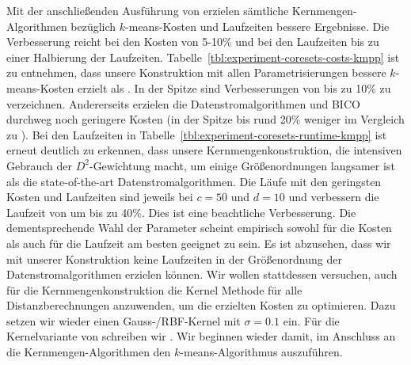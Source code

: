 Mit der anschließenden Ausführung von \kmpp{} erzielen sämtliche Kernmengen-Algorithmen bezüglich $k$-means-Kosten und
Laufzeiten bessere Ergebnisse. Die Verbesserung reicht bei den Kosten von 5-10\% und bei den Laufzeiten bis zu einer Halbierung
der Laufzeiten.
Tabelle~\ref{tbl:experiment-coresets-costs-kmpp} ist zu entnehmen, dass unsere Konstruktion mit allen Parametrisierungen bessere
$k$-means-Kosten erzielt als \kmpp. In der Spitze sind Verbesserungen von bis zu 10\% zu verzeichnen. Andererseits erzielen
die Datenstromalgorithmen \Skmpp und BICO durchweg noch geringere Kosten (in der Spitze bis rund 20\% weniger im Vergleich
zu \kmpp). Bei den Laufzeiten in Tabelle~\ref{tbl:experiment-coresets-runtime-kmpp} ist erneut deutlich zu erkennen, dass unsere
Kernmengenkonstruktion, die intensiven Gebrauch der $D^2$-Gewichtung macht, um einige Größenordnungen langsamer ist als die
state-of-the-art Datenstromalgorithmen. Die Läufe mit den geringsten Kosten und Laufzeiten sind jeweils bei $c = 50$ und
$d = 10$ und verbessern die Laufzeit von \kmpp{} um bis zu 40\%. Dies ist eine beachtliche Verbesserung.
Die dementsprechende Wahl der Parameter scheint empirisch sowohl für die Kosten als auch für die Laufzeit am besten geeignet
zu sein. 
\absatz
Es ist abzusehen, dass wir mit unserer Konstruktion keine Laufzeiten in der Größenordnung der Datenstromalgorithmen erzielen
können. Wir wollen stattdessen versuchen, auch für die Kernmengenkonstruktion die Kernel Methode für alle Distanzberechnungen
anzuwenden, um die erzielten Kosten zu optimieren. Dazu setzen wir wieder einen Gauss-/RBF-Kernel mit $\sigma = 0.1$ ein.
Für die Kernelvariante von \CsTwo{} schreiben wir \KCsTwo. Wir beginnen wieder damit, im Anschluss an die Kernmengen-Algorithmen
den $k$-means-Algorithmus auszuführen.
\newpage
